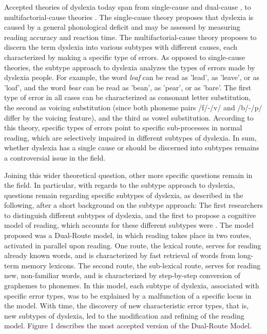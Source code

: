 Accepted theories of dyslexia today span from single-cause \citep{stanovich1988explaining, s98, s00} and dual-cause \citep{wolf1999double}, to multifactorial-cause theories \citep{ck12}. The single-cause theory proposes that dyslexia is caused by a general phonological deficit and may be assessed by measuring reading accuracy and reaction time. The multifactorial-cause theory proposes to discern the term dyslexia into various subtypes with different causes, each characterized by making a specific type of errors. As opposed to single-cause theories, the subtype approach to dyslexia analyzes the types of errors made by dyslexia people. For example, the word {\it leaf} can be read as 'lead', as 'leave', or as 'loaf', and the word {\it bear} can be read as 'bean', as 'pear', or as 'bare'. The first type of error in all cases can be characterized as consonant letter substitution, the second as voicing substitution (since both phoneme pairs /f/-/v/ and /b/-/p/ differ by the voicing feature), and the third as vowel substitution. According to this theory, specific types of errors point to specific sub-processes in normal reading, which are selectively impaired in different subtypes of dyslexia. In sum, whether dyslexia has a single cause or should be discerned into subtypes remains a controversial issue in the field.

Joining this wider theoretical question, other more specific questions remain in the field. In particular, with regards to the subtype approach to dyslexia, questions remain regarding specific subtypes of dyslexia, as described in the following, after a short background on the subtype approach: The first researchers to distinguish different subtypes of dyslexia, and the first to propose a cognitive model of reading, which accounts for these different subtypes were \citet{mn73}. The model proposed was a Dual-Route model, in which reading takes place in two routes, activated in parallel upon reading. One route, the lexical route, serves for reading already known words, and is characterized by fast retrieval of words from long-term memory lexicons. The second route, the sub-lexical route, serves for reading new, non-familiar words, and is characterized by step-by-step conversion of graphemes to phonemes. In this model, each subtype of dyslexia, associated with specific error types, was to be explained by a malfunction of a specific locus in the model. With time, the discovery of new characteristic error types, that is, new subtypes of dyslexia, led to the modification and refining of the reading model. Figure 1 describes the most accepted version of the Dual-Route Model. 

